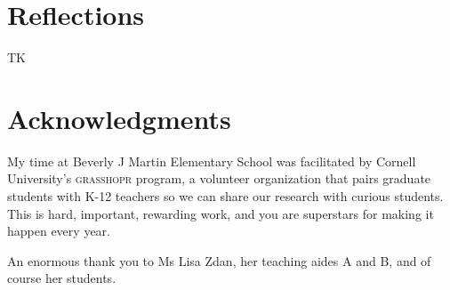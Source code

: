 \documentclass[sigplan]{acmart}
\makeatletter
\newcommand{\anshuman}[2][]{\todo[#1,backgroundcolor=blue!20]{A:\@ #2}}
\makeatother
\begin{document}
\section*{Reflections}

TK

\section*{Acknowledgments}

My time at Beverly J Martin Elementary School was facilitated by Cornell University's \textsc{grasshopr} program, a volunteer organization that pairs graduate students with K-12 teachers so we can share our research with curious students.
This is hard, important, rewarding work, and you are superstars for making it happen every year.

An enormous thank you to Ms Lisa Zdan, her teaching aides A and B\anshuman{ask}, and of course her students.

\appendix



\end{document}

